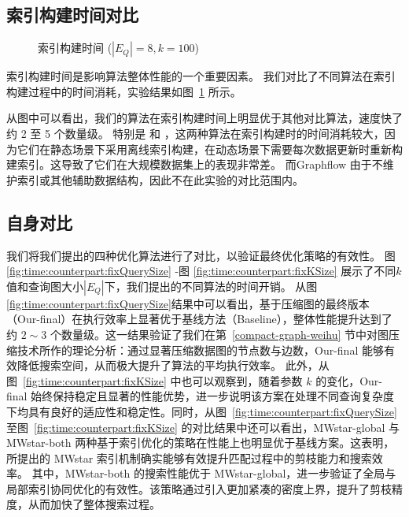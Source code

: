 \subsection{索引构建时间对比}
\label{ch5:index-construction}
\begin{figure}[h!]
    \centering
    \caption{索引构建时间  ($|E_Q|=8, k=100$)}
    \label{fig:exp:time:index}
\end{figure} 
索引构建时间是影响算法整体性能的一个重要因素。
我们对比了不同算法在索引构建过程中的时间消耗，实验结果如图~\ref{fig:exp:time:index} 所示。   


从图中可以看出，我们的算法在索引构建时间上明显优于其他对比算法，速度快了约 2 至 5 个数量级。
特别是 \itk 和 \pm，这两种算法在索引构建时的时间消耗较大，因为它们在静态场景下采用离线索引构建，在动态场景下需要每次数据更新时重新构建索引。这导致了它们在大规模数据集上的表现非常差。
而Graphflow 由于不维护索引或其他辅助数据结构，因此不在此实验的对比范围内。

\subsection{自身对比}
\label{ch5:couterparts}




\label{sec:couterparts}
我们将我们提出的四种优化算法进行了对比，以验证最终优化策略的有效性。
图 \ref{fig:time:counterpart:fixQuerySize} -图 \ref{fig:time:counterpart:fixKSize} 展示了不同$k$值和查询图大小$|E_Q|$下，我们提出的不同算法的时间开销。
从图\ref{fig:time:counterpart:fixQuerySize}结果中可以看出，基于压缩图的最终版本（Our-final）在执行效率上显著优于基线方法（Baseline），整体性能提升达到了约 $2{\sim}3$ 个数量级。这一结果验证了我们在第~\ref{compact-graph-weihu} 节中对图压缩技术所作的理论分析：通过显著压缩数据图的节点数与边数，Our-final 能够有效降低搜索空间，从而极大提升了算法的平均执行效率。
此外，从图~\ref{fig:time:counterpart:fixKSize} 中也可以观察到，随着参数 $k$ 的变化，Our-final 始终保持稳定且显著的性能优势，进一步说明该方案在处理不同查询复杂度下均具有良好的适应性和稳定性。同时，从图~\ref{fig:time:counterpart:fixQuerySize} 至图~\ref{fig:time:counterpart:fixKSize} 的对比结果中还可以看出，MWstar-global 与 MWstar-both 两种基于索引优化的策略在性能上也明显优于基线方案。这表明，所提出的 MWstar 索引机制确实能够有效提升匹配过程中的剪枝能力和搜索效率。
其中，MWstar-both 的搜索性能优于 MWstar-global，进一步验证了全局与局部索引协同优化的有效性。该策略通过引入更加紧凑的密度上界，提升了剪枝精度，从而加快了整体搜索过程。

